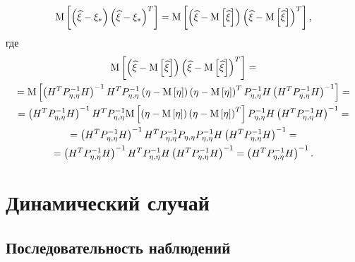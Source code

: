 $$
	\mathrm{M} \left [ \left ( \widehat{\xi} - \xi_* \right ) \left ( \widehat{\xi} - \xi_* \right )^T \right ]
	= \mathrm{M} \left [ \left ( \widehat{\xi} - \mathrm{M} \left [ \widehat{\xi} \right ] \right ) \left ( \widehat{\xi} - \mathrm{M} \left [ \widehat{\xi} \right ] \right )^T \right ]
	,
$$
где
\begin{multline} \label{equation:filtering:in_observations:static:estimate_covariance}
	\mathrm{M} \left [ \left ( \widehat{\xi} - \mathrm{M} \left [ \widehat{\xi} \right ] \right ) \left ( \widehat{\xi} - \mathrm{M} \left [ \widehat{\xi} \right ] \right )^T \right ] = \\
	= \mathrm{M} \left [ \left ( H^T P_{\eta, \eta}^{-1} H \right )^{-1} H^T P_{\eta, \eta}^{-1} \left ( \eta - \mathrm{M} \left [ \eta \right ] \right ) \left ( \eta - \mathrm{M} \left [ \eta \right ] \right )^T  P_{\eta, \eta}^{-1} H \left ( H^T P_{\eta, \eta}^{-1} H \right )^{-1} \right ] = \\
	= \left ( H^T P_{\eta, \eta}^{-1} H \right )^{-1} H^T P_{\eta, \eta}^{-1} \mathrm{M} \left [  \left ( \eta - \mathrm{M} \left [ \eta \right ] \right ) \left ( \eta - \mathrm{M} \left [ \eta \right ] \right )^T  \right ] P_{\eta, \eta}^{-1} H \left ( H^T P_{\eta, \eta}^{-1} H \right )^{-1} = \\
	= \left ( H^T P_{\eta, \eta}^{-1} H \right )^{-1} H^T P_{\eta, \eta}^{-1} P_{\eta, \eta} P_{\eta, \eta}^{-1} H \left ( H^T P_{\eta, \eta}^{-1} H \right )^{-1} = \\
	= \left ( H^T P_{\eta, \eta}^{-1} H \right )^{-1} H^T P_{\eta, \eta}^{-1} H \left ( H^T P_{\eta, \eta}^{-1} H \right )^{-1}
	= \left ( H^T P_{\eta, \eta}^{-1} H \right )^{-1}
	.
\end{multline}

\section{Динамический случай}

\subsection{Последовательность наблюдений}

